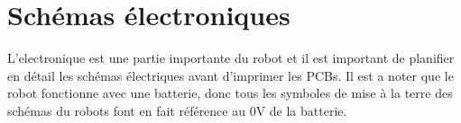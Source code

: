 \chapter{Schémas électroniques}

L'electronique est une partie importante du robot et il est important de planifier en détail les schémas électriques avant d'imprimer les PCBs. Il est a noter que le robot fonctionne avec une batterie, donc tous les symboles de mise à la terre des schémas du robots font en fait référence au 0V de la batterie.






